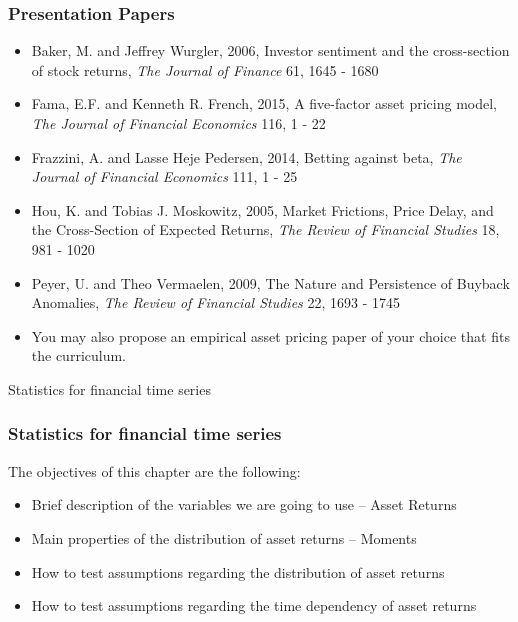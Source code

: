\documentclass[xcolor=dvipsnames, english, 8pt]{beamer}
\begin{document}
\begin{frame}
    \frametitle{Presentation Papers}
    \begin{itemize}
 \item Baker, M. and Jeffrey Wurgler, 2006, Investor sentiment and the cross-section of stock returns, \textit{The Journal of Finance} 61, 1645 - 1680
  \item Fama, E.F. and Kenneth R. French, 2015, A five-factor asset pricing model, \textit{The Journal of Financial Economics} 116, 1 - 22
  \item Frazzini, A. and Lasse Heje Pedersen, 2014, Betting against beta,  \textit{The Journal of Financial Economics} 111, 1 - 25
  \item Hou, K. and Tobias J. Moskowitz, 2005, Market Frictions, Price Delay, and the Cross-Section of Expected Returns, \textit{The Review of Financial Studies} 18, 981 - 1020

  \item Peyer, U. and Theo Vermaelen, 2009, The Nature and Persistence of Buyback Anomalies, \textit{The Review of Financial Studies} 22, 1693 - 1745
  \item You may also propose an empirical asset pricing paper of your choice that fits the curriculum.
  \end{itemize}
\end{frame}


\begin{frame}[label=ret_char]
    \begin{center}
        {\color{ubRed} \Huge{Statistics for financial time series}}
    \end{center}
\end{frame}

\begin{frame}
    \frametitle{Statistics for financial time series}
    The objectives of this chapter are the following:\vspace{0.25cm}\\
    \begin{itemize}
        \item Brief description of the variables we are going to use – Asset Returns
        \item Main properties of the distribution of asset returns – Moments
        \item How to test assumptions regarding the distribution of asset returns
        \item How to test assumptions regarding the time dependency of asset returns
    \end{itemize}
\end{frame}
\end{document}
